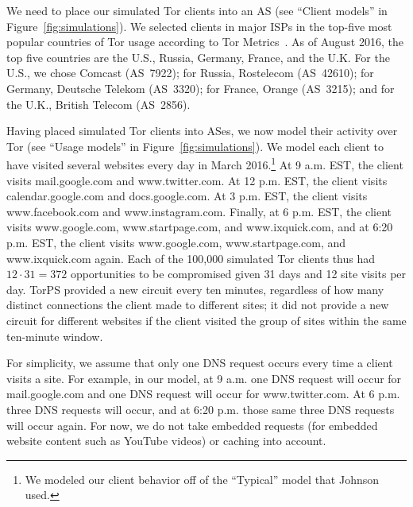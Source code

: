 We need to place our simulated Tor clients into an AS (see ``Client models'' in
Figure~\ref{fig:simulations}).  We selected clients in major ISPs in the
top-five most popular countries of Tor usage according to Tor
Metrics~\cite{metrics-countries}.  As of August 2016, the top five countries are
the U.S., Russia, Germany, France, and the U.K.  For the U.S., we chose Comcast
(AS~7922); for Russia, Rostelecom (AS~42610); for Germany, Deutsche Telekom
(AS~3320); for France, Orange (AS~3215); and for the U.K., British Telecom
(AS~2856).

Having placed simulated Tor clients into ASes, we now model their activity over
Tor (see ``Usage models'' in Figure~\ref{fig:simulations}).  We model each
client to have visited several websites every day in March 2016.\footnote{We
modeled our client behavior off of the ``Typical'' model that Johnson
\ea~\cite[\S~5.1.2]{Johnson2013a} used.}  At 9 a.m. EST, the client visits
mail.google.com and www.twitter.com.  At 12 p.m. EST, the client visits
calendar.google.com and docs.google.com. At 3 p.m. EST, the client
visits www.facebook.com and www.instagram.com.  Finally, at 6 p.m.
EST, the client visits www.google.com, www.startpage.com, and
www.ixquick.com, and at 6:20 p.m. EST, the client visits www.google.com,
www.startpage.com, and www.ixquick.com again. Each of the 100,000
simulated Tor clients thus had $12 \cdot 31 = 372$ opportunities to be
compromised given 31 days and 12 site visits per day.  TorPS provided a new
circuit every ten minutes, regardless of how many distinct connections the
client made to different sites; it did not provide a new circuit for different
websites if the client visited the group of sites within the same ten-minute
window.

For simplicity, we assume that only one DNS request occurs every time a client
visits a site. For example, in our model, at 9 a.m. one DNS request will occur
for mail.google.com and one DNS request will occur for
www.twitter.com. At 6 p.m. three DNS requests will occur, and at 6:20 p.m.
those same three DNS requests will occur again.   For now, we do not take
embedded requests (\ie for embedded website content such as YouTube videos) or
caching into account.


